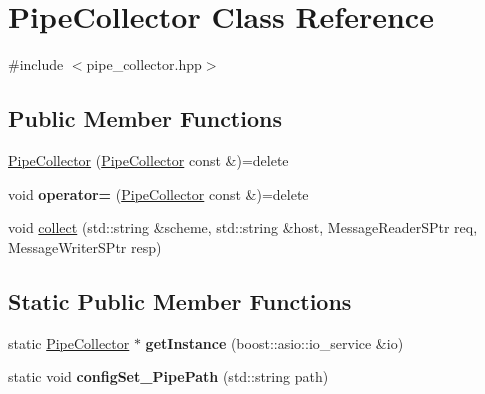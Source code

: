 \hypertarget{class_pipe_collector}{}\section{Pipe\+Collector Class Reference}
\label{class_pipe_collector}


{\ttfamily \#include $<$pipe\+\_\+collector.\+hpp$>$}

\subsection*{Public Member Functions}
\begin{DoxyCompactItemize}
\item 
\hyperlink{class_pipe_collector_ad2a04b5f8e95e204cfe1d85bded0c92d}{Pipe\+Collector} (\hyperlink{class_pipe_collector}{Pipe\+Collector} const \&)=delete
\item 
\mbox{\label{class_pipe_collector_ae286d157a61dbef510e1903ad245e96e}} 
void {\bfseries operator=} (\hyperlink{class_pipe_collector}{Pipe\+Collector} const \&)=delete
\item 
void \hyperlink{class_pipe_collector_a4deab58d1636c9af54146df61f4d244c}{collect} (std\+::string \&scheme, std\+::string \&host, Message\+Reader\+S\+Ptr req, Message\+Writer\+S\+Ptr resp)
\end{DoxyCompactItemize}
\subsection*{Static Public Member Functions}
\begin{DoxyCompactItemize}
\item 
\mbox{\label{class_pipe_collector_ad5f10086bc650dc13a1b620c2c425edb}} 
static \hyperlink{class_pipe_collector}{Pipe\+Collector} $\ast$ {\bfseries get\+Instance} (boost\+::asio\+::io\+\_\+service \&io)
\item 
\mbox{\label{class_pipe_collector_ab2b95b11b4910616abff4846fe291064}} 
static void {\bfseries config\+Set\+\_\+\+Pipe\+Path} (std\+::string path)
\end{DoxyCompactItemize}
